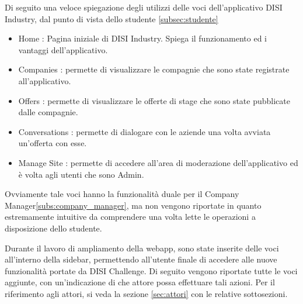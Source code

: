 Di seguito una veloce spiegazione degli utilizzi delle voci dell'applicativo DISI Industry, dal punto di vista dello studente \ref{subsec:studente}
\begin{itemize}
    \item Home : Pagina iniziale di DISI Industry. Spiega il funzionamento ed i vantaggi dell'applicativo.
    \item Companies : permette di visualizzare le compagnie che sono state registrate all'applicativo.
    \item Offers : permette di visualizzare le offerte di stage che sono state pubblicate dalle compagnie.
    \item Conversations : permette di dialogare con le aziende una volta avviata un'offerta con esse.
    \item Manage Site : permette di accedere all'area di moderazione dell'applicativo ed è volta agli utenti che sono Admin.
\end{itemize}

Ovviamente tale voci hanno la funzionalità duale per il Company Manager\ref{subs:company_manager}, ma non vengono riportate in quanto estremamente intuitive da comprendere una volta lette le operazioni a disposizione dello studente.

Durante il lavoro di ampliamento della webapp, sono state inserite delle voci all'interno della sidebar, permettendo all'utente finale di accedere alle nuove funzionalità portate da DISI Challenge. Di seguito vengono riportate tutte le voci aggiunte, con un'indicazione di che attore possa effettuare tali azioni. Per il riferimento agli attori, si veda la sezione \ref{sec:attori} con le relative sottosezioni.


